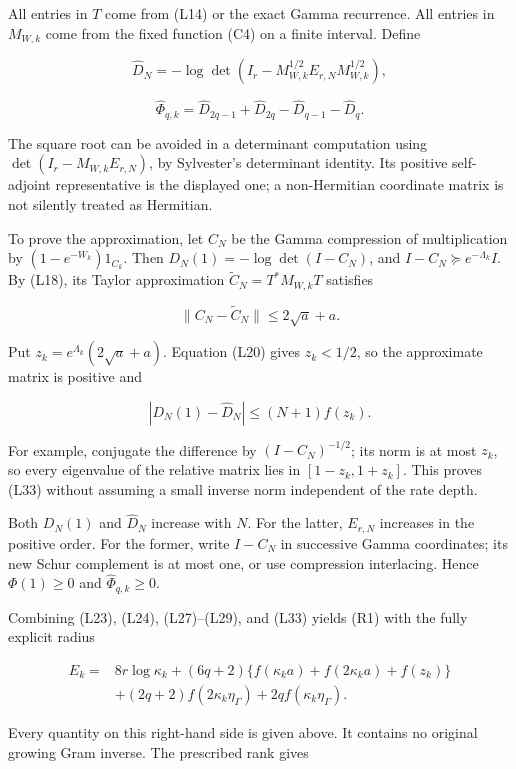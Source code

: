 All entries in \(T\) come from (L14) or the exact Gamma recurrence. All entries in \(M_{W,k}\) come from the fixed function (C4) on a finite interval. Define

\[
\widehat D_N=-\log\det(I_r-M_{W,k}^{1/2}E_{r,N}M_{W,k}^{1/2}),
\]

\[
\boxed{\widehat\Phi_{q,k}
=\widehat D_{2q-1}+\widehat D_{2q}-\widehat D_{q-1}-\widehat D_q.}
\tag{L32}
\]

The square root can be avoided in a determinant computation using
\(\det(I_r-M_{W,k}E_{r,N})\), by Sylvester's determinant identity. Its positive self-adjoint representative is the displayed one; a non-Hermitian coordinate matrix is not silently treated as Hermitian.

To prove the approximation, let \(C_N\) be the Gamma compression of multiplication by \((1-e^{-W_k})1_{C_k}\). Then
\(D_N(1)=-\log\det(I-C_N)\), and \(I-C_N\succeq e^{-\Lambda_k}I\).
By (L18), its Taylor approximation \(\widetilde C_N=T^*M_{W,k}T\) satisfies

\[
\|C_N-\widetilde C_N\|\le2\sqrt a+a.
\]

Put \(z_k=e^{\Lambda_k}(2\sqrt a+a)\). Equation (L20) gives \(z_k<1/2\), so the approximate matrix is positive and

\[
|D_N(1)-\widehat D_N|\le(N+1)f(z_k).
\tag{L33}
\]

For example, conjugate the difference by \((I-C_N)^{-1/2}\); its norm is at most \(z_k\), so every eigenvalue of the relative matrix lies in \([1-z_k,1+z_k]\). This proves (L33) without assuming a small inverse norm independent of the rate depth.

Both \(D_N(1)\) and \(\widehat D_N\) increase with \(N\). For the latter, \(E_{r,N}\) increases in the positive order. For the former, write \(I-C_N\) in successive Gamma coordinates; its new Schur complement is at most one, or use compression interlacing. Hence \(\Phi(1)\ge0\) and \(\widehat\Phi_{q,k}\ge0\).

Combining (L23), (L24), (L27)--(L29), and (L33) yields (R1) with the fully explicit radius

\[
\boxed{\begin{aligned}
E_k={}&8r\log\kappa_k+(6q+2)
\{f(\kappa_k a)+f(2\kappa_k a)+f(z_k)\}\\
&+(2q+2)f(2\kappa_k\eta_\Gamma)
+2qf(\kappa_k\eta_\Gamma).
\end{aligned}}
\tag{L34}
\]

Every quantity on this right-hand side is given above. It contains no original growing Gram inverse. The prescribed rank gives


